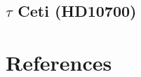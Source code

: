 \subsection{$\tau$ Ceti (HD10700)}




\pagebreak
\section{References}
\label{\thesection}
\vspace{-1.5cm}


